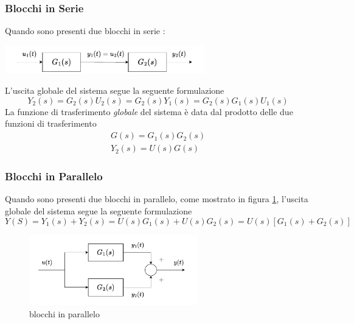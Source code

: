 \documentclass[10pt, letterpaper]{report}
\begin{document}
\subsubsection{Blocchi in Serie}
Quando sono presenti due blocchi in serie :
\begin{center}
    \includegraphics[width=0.65\textwidth ]{images/blocchiInSerie.pdf}
\end{center}
L'uscita globale del sistema segue la seguente formulazione 
$$ Y_2(s)=G_2(s)U_2(s)=G_2(s)Y_1(s)=G_2(s)G_1(s)U_1(s)$$
La funzione di trasferimento \textit{globale} del sistema è data dal prodotto delle 
due funzioni di trasferimento $$ \begin{matrix}
    G(s)=G_1(s)G_2(s)\\ Y_2(s)=U(s)G(s)
\end{matrix}$$
\subsubsection{Blocchi in Parallelo}
Quando sono presenti due blocchi in parallelo, come mostrato in figura 
\ref{fig:parallelo}, l'uscita globale del sistema segue la seguente formulazione 
$$ Y(S)=Y_1(s)+Y_2(s)=U(s)G_1(s)+U(s)G_2(s)=U(s)[G_1(s)+G_2(s)]$$\begin{center}
    \begin{figure}[h!]
        \centering
        \includegraphics[width=0.65\textwidth ]{images/blocchiInParallelo.pdf}
        \caption{blocchi in parallelo}
        \label{fig:parallelo}
    \end{figure}
\end{center}
\end{document}
